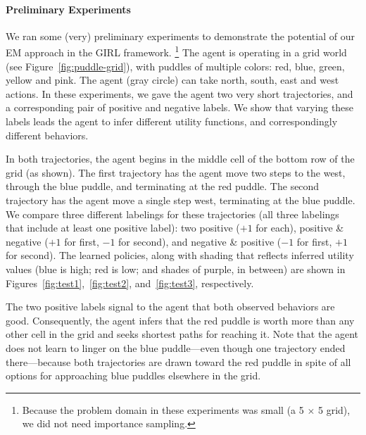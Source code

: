 
\vspace{\up}
\paragraph{Preliminary Experiments}

We ran some (very) preliminary experiments to demonstrate the
potential of our EM approach in the GIRL framework.%
\footnote{Because the problem domain in these experiments
was small (a 5 $\times$ 5 grid), we did not need importance sampling.}
%
The agent is operating in a grid world (see
Figure~\ref{fig:puddle-grid}), with puddles of multiple colors: red,
blue, green, yellow and pink.  The agent (gray circle) can take north, south, east
and west actions.
In these experiments, we gave the agent two very short
trajectories, and a corresponding pair of positive and negative
labels.  We show that varying these labels leads the agent to
infer different utility functions, and correspondingly different
behaviors.

In both trajectories, the agent begins in the middle cell of the
bottom row of the grid (as shown).  The first trajectory has the agent
move two steps to the west, through the blue puddle, and terminating
at the red puddle.  The second trajectory has the agent move a single
step west, terminating at the blue puddle.
%
%
We compare three different labelings for these trajectories (all three
labelings that include at least one positive label): two positive
($+1$ for each), positive \& negative ($+1$ for first, $-1$ for
second), and negative \& positive ($-1$ for first, $+1$ for
second). The learned policies, along with shading that reflects
inferred utility values (blue is high; red is low; and shades of
purple, in between)
are shown in Figures~\ref{fig:test1},~\ref{fig:test2},
and~\ref{fig:test3}, respectively.

The two positive labels signal to the agent that both observed
behaviors are good.  Consequently, the agent infers that the red
puddle is worth more than any other cell in the grid and seeks
shortest paths for reaching it.  Note that the agent does not learn to
linger on the blue puddle---even though one trajectory ended
there---because both trajectories are drawn toward the red puddle in
spite of all options for approaching blue puddles elsewhere in the
grid.


